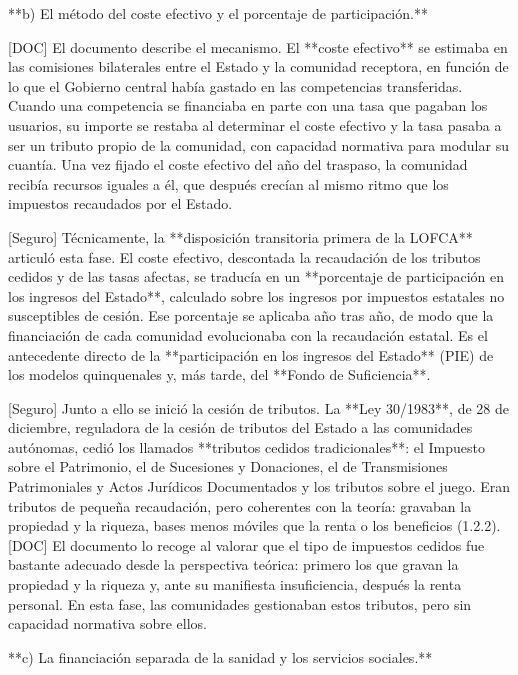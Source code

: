 \documentclass[10pt,a4paper]{article}
\begin{document}
**b) El método del coste efectivo y el porcentaje de participación.**

[DOC] El documento describe el mecanismo. El **coste efectivo** se estimaba en las comisiones bilaterales entre el Estado y la comunidad receptora, en función de lo que el Gobierno central había gastado en las competencias transferidas. Cuando una competencia se financiaba en parte con una tasa que pagaban los usuarios, su importe se restaba al determinar el coste efectivo y la tasa pasaba a ser un tributo propio de la comunidad, con capacidad normativa para modular su cuantía. Una vez fijado el coste efectivo del año del traspaso, la comunidad recibía recursos iguales a él, que después crecían al mismo ritmo que los impuestos recaudados por el Estado.

[Seguro] Técnicamente, la **disposición transitoria primera de la LOFCA** articuló esta fase. El coste efectivo, descontada la recaudación de los tributos cedidos y de las tasas afectas, se traducía en un **porcentaje de participación en los ingresos del Estado**, calculado sobre los ingresos por impuestos estatales no susceptibles de cesión. Ese porcentaje se aplicaba año tras año, de modo que la financiación de cada comunidad evolucionaba con la recaudación estatal. Es el antecedente directo de la **participación en los ingresos del Estado** (PIE) de los modelos quinquenales y, más tarde, del **Fondo de Suficiencia**.

[Seguro] Junto a ello se inició la cesión de tributos. La **Ley 30/1983**, de 28 de diciembre, reguladora de la cesión de tributos del Estado a las comunidades autónomas, cedió los llamados **tributos cedidos tradicionales**: el Impuesto sobre el Patrimonio, el de Sucesiones y Donaciones, el de Transmisiones Patrimoniales y Actos Jurídicos Documentados y los tributos sobre el juego. Eran tributos de pequeña recaudación, pero coherentes con la teoría: gravaban la propiedad y la riqueza, bases menos móviles que la renta o los beneficios (1.2.2). [DOC] El documento lo recoge al valorar que el tipo de impuestos cedidos fue bastante adecuado desde la perspectiva teórica: primero los que gravan la propiedad y la riqueza y, ante su manifiesta insuficiencia, después la renta personal. En esta fase, las comunidades gestionaban estos tributos, pero sin capacidad normativa sobre ellos.

**c) La financiación separada de la sanidad y los servicios sociales.**
\end{document}
